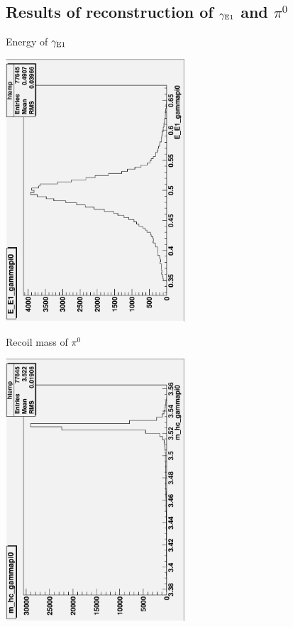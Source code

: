 \documentclass{beamer}
\begin{document}
\subsection{Results of reconstruction of ${\gamma}_{\rm E1}$ and ${\pi}^0$}
\begin{frame}{Energy of ${\gamma}_{\rm E1}$}
\begin{center}
\includegraphics[width=0.5\textwidth,angle=270]{figures/E_E1_gammapi0.eps}
\end{center}
\end{frame}
\begin{frame}{Recoil mass of ${\pi}^0$}
\begin{center}
\includegraphics[width=0.5\textwidth,angle=270]{figures/m_hc_gammapi0.eps}
\end{center}
\end{frame}
\end{document}
